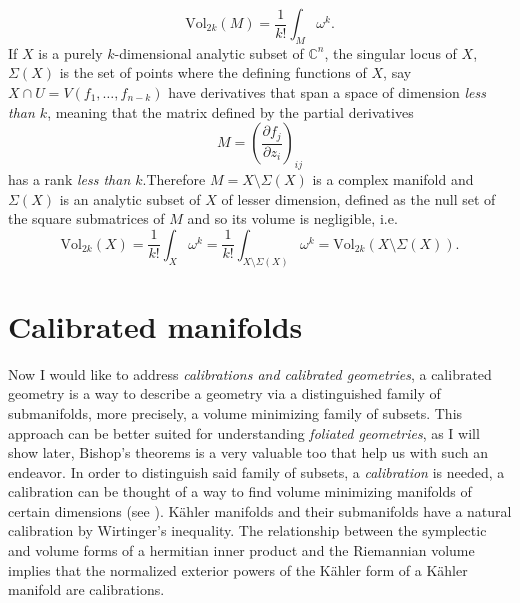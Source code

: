 \documentclass[12pt,twoside,a4paper]{report}
\newcommand{\con}{\ensuremath{\mathbb{C}^n}}
\newcommand{\sig}{\ensuremath{\Sigma}}
\begin{document}
\begin{equation}
        \textrm{Vol}_{2k}(M)= \frac{1}{k!}\int_M \omega^k.
\end{equation}
If $X$ is a purely $k$-dimensional analytic subset of $\con$, the singular locus of $X$, $\sig(X)$ is the set of points where the defining functions of $X$, say $X\cap U=V(f_{1},\dots,f_{n-k})$ have derivatives that span a space of dimension \emph{less than $k$}, meaning that the matrix defined by the partial derivatives
\[
  M=\left(\dfrac{\partial f_{j}}{\partial z_{i}}\right)_{ij}
\]
has a rank \emph{less than $k$}.Therefore $M=X\setminus\sig(X)$ is a complex manifold and $\Sigma(X)$ is an analytic subset of $X$ of lesser dimension, defined as the null set of the square submatrices of $M$ and so its volume is negligible, i.e.
\[
    \textrm{Vol}_{2k}(X)= \frac{1}{k!}\int_{X} \omega^k= \frac{1}{k!}\int_{X\setminus\sig(X)} \omega^k=
    \textrm{Vol}_{2k}(X\setminus\sig(X)).
\]


\section{Calibrated manifolds}
Now I would like to address \emph{calibrations and calibrated geometries}, a calibrated geometry is a way to describe a geometry via a distinguished family of submanifolds, more precisely, a volume minimizing family of subsets. This approach can be better suited for understanding \emph{foliated geometries}, as I will show later, Bishop's theorems is a very valuable too that help us with such an endeavor.
In order to distinguish said family of subsets, a \emph{calibration} is needed, a calibration can be thought of a way to find volume minimizing manifolds of certain dimensions (see \cite{Harvey}). K\"ahler manifolds and their submanifolds have a natural calibration by Wirtinger's inequality. The relationship between the symplectic and volume forms of a hermitian inner product and the Riemannian volume implies that the normalized exterior powers of the Kähler form of a Kähler manifold are calibrations.
\end{document}
